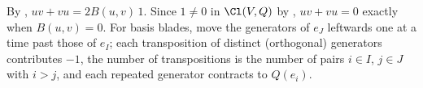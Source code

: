 By , $uv + vu = 2B(u, v)\,1$. Since $1 \ne 0$ in $\Cl(V, Q)$ by , $uv + vu = 0$ exactly when $B(u, v) = 0$. For basis blades, move the generators of $e_J$ leftwards one at a time past those of $e_I$; each transposition of distinct (orthogonal) generators contributes $-1$, the number of transpositions is the number of pairs $i \in I$, $j \in J$ with $i > j$, and each repeated generator contracts to $Q(e_i)$.
